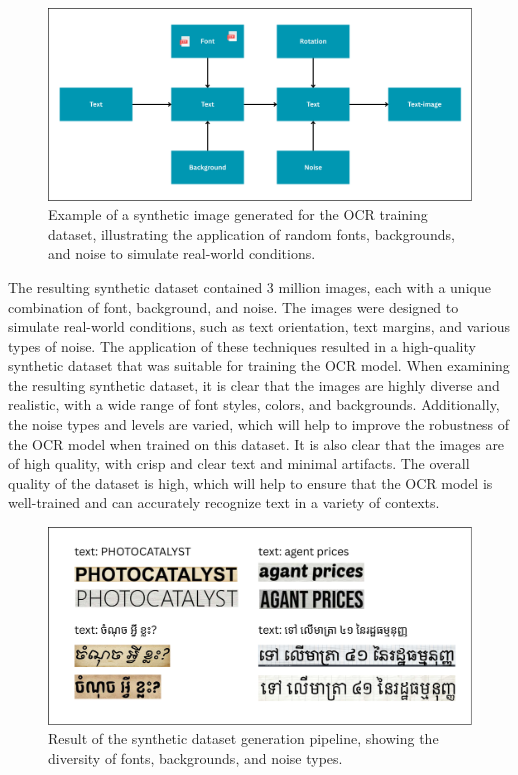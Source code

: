 \begin{figure}[ht]
    \centering
    \includegraphics[width=\textwidth]{figures/synthetic_image.png}
    \caption{Example of a synthetic image generated for the OCR training dataset, 
    illustrating the application of random fonts, backgrounds, and noise to simulate 
    real-world conditions.}
    \label{fig:synthetic-image}
\end{figure}

The resulting synthetic dataset contained 3 million images, each with a unique 
combination of font, background, and noise. The images were designed to simulate 
real-world conditions, such as text orientation, text margins, and various types of 
noise. The application of these techniques resulted in a high-quality synthetic dataset 
that was suitable for training the OCR model. When examining the resulting synthetic 
dataset, it is clear that the images are highly diverse and realistic, with a wide range 
of font styles, colors, and backgrounds. Additionally, the noise types and levels are 
varied, which will help to improve the robustness of the OCR model when trained on 
this dataset. It is also clear that the images are of high quality, with crisp and clear 
text and minimal artifacts. The overall quality of the dataset is high, which will help 
to ensure that the OCR model is well-trained and can accurately recognize text in a 
variety of contexts.

\begin{figure}[ht]
    \centering
    \includegraphics[width=\textwidth]{figures/resutl_synthetic_dataset.png}
    \caption{Result of the synthetic dataset generation pipeline, showing the diversity of fonts, backgrounds, and noise types.}
    \label{fig:result_synthetic_dataset}
\end{figure}

